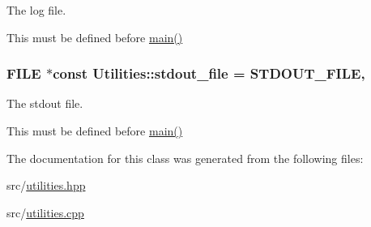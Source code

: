 The log file. 

This must be defined before \hyperlink{shadow__stack_8cpp_a0ddf1224851353fc92bfbff6f499fa97}{main()} 
\subsubsection[{\texorpdfstring{stdout\+\_\+file}{stdout_file}}]{\setlength{\rightskip}{0pt plus 5cm}F\+I\+LE $\ast$const Utilities\+::stdout\+\_\+file = {\bf S\+T\+D\+O\+U\+T\+\_\+\+F\+I\+LE}\hspace{0.3cm}{\ttfamily [static]}, {\ttfamily [private]}}\hypertarget{class_utilities_a224eea0a234ac9877a8334f74fc89ef0}{}\label{class_utilities_a224eea0a234ac9877a8334f74fc89ef0}


The stdout file. 

This must be defined before \hyperlink{shadow__stack_8cpp_a0ddf1224851353fc92bfbff6f499fa97}{main()} 

The documentation for this class was generated from the following files\+:\begin{DoxyCompactItemize}
\item 
src/\hyperlink{utilities_8hpp}{utilities.\+hpp}\item 
src/\hyperlink{utilities_8cpp}{utilities.\+cpp}\end{DoxyCompactItemize}
